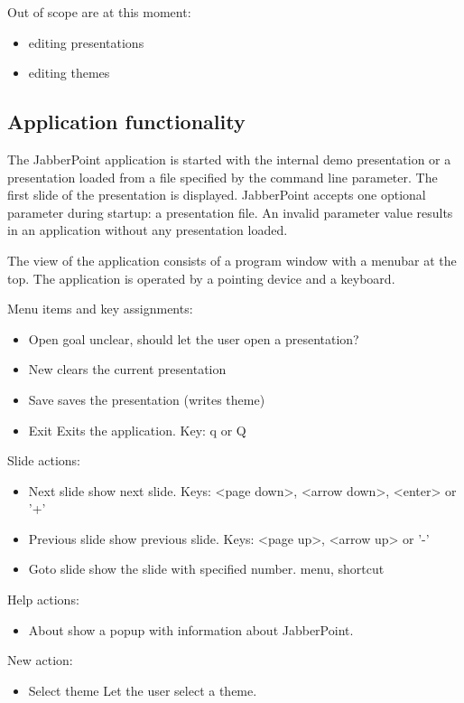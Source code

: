 \documentclass[a4paper]{article}
\begin{document}
Out of scope are at this moment:
\begin{itemize}
\item editing presentations
\item editing themes 
\end{itemize}

\subsection{Application functionality}
The JabberPoint application is started with the internal demo presentation or a presentation loaded from a file specified by the command line parameter. The first slide of the presentation is displayed.
JabberPoint accepts one optional parameter during startup: a presentation file. 
An invalid parameter value results in an application without any presentation loaded.

The view of the application consists of a program window with a menubar at the top. The application is operated by a pointing device and a keyboard. 

Menu items and key assignments:
\begin{itemize}
\item{Open} goal unclear, should let the user open a presentation? 
\item{New} clears the current presentation
\item{Save} saves the presentation (writes theme)
\item{Exit} Exits the application. Key: q or Q
\end{itemize}

Slide actions:
\begin{itemize}
\item{Next slide} show next slide. Keys: \textless page down\textgreater, \textless arrow down\textgreater, \textless enter\textgreater{ }or '+'
\item{Previous slide} show previous slide. Keys: \textless page up\textgreater, \textless arrow up\textgreater{ }or '-'
\item{Goto slide} show the slide with specified number. menu, shortcut
\end{itemize}

Help actions:
\begin{itemize}
\item{About} show a popup with information about JabberPoint.
\end{itemize}

New action:
\begin{itemize}
\item{Select theme} Let the user select a theme. 
\end{itemize}
\end{document}
